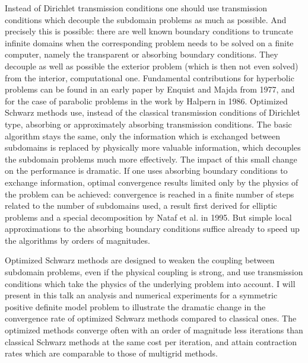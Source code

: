 \documentclass{report}
\begin{document}
Instead of Dirichlet transmission conditions one should use transmission
conditions which decouple the subdomain problems as much as possible. And
precisely this is possible: there are well known boundary conditions to
truncate infinite domains when the corresponding problem needs to be
solved on a finite computer, namely the transparent or absorbing boundary
conditions. They decouple as well as possible the exterior problem (which
is then not even solved) from the interior, computational one.
Fundamental contributions for hyperbolic problems can be found in an
early paper by Enquist and Majda from 1977, and for the case of parabolic
problems in the work by Halpern in 1986. Optimized Schwarz methods use,
instead of the classical transmission conditions of Dirichlet type,
absorbing or approximately absorbing transmission conditions. The basic
algorithm stays the same, only the information which is exchanged between
subdomains is replaced by physically more valuable information, which
decouples the subdomain problems much more effectively. The impact of
this small change on the performance is dramatic. If one uses absorbing
boundary conditions to exchange information, optimal convergence results
limited only by the physics of the problem can be achieved: convergence
is reached in a finite number of steps related to the number of
subdomains used, a result first derived for elliptic problems and a
special decomposition by Nataf et al. in 1995. But simple local
approximations to the absorbing boundary conditions suffice already to
speed up the algorithms by orders of magnitudes.

Optimized Schwarz methods are designed to weaken the coupling between
subdomain problems, even if the physical coupling is strong, and use
transmission conditions which take the physics of the underlying problem
into account. I will present in this talk an analysis and numerical
experiments for a symmetric positive definite model problem to illustrate
the dramatic change in the convergence rate of optimized Schwarz methods
compared to classical ones. The optimized methods converge often with an
order of magnitude less iterations than classical Schwarz methods at the
same cost per iteration, and attain contraction rates which are
comparable to those of multigrid methods.
\end{document}
